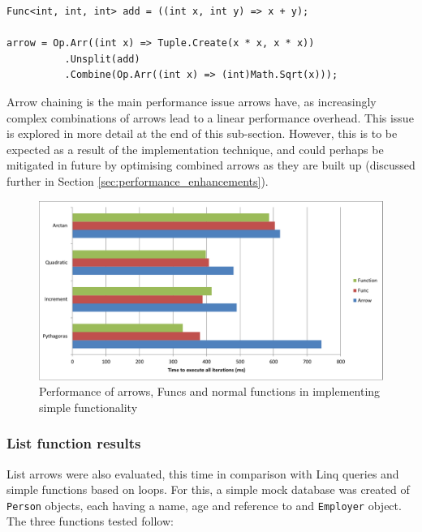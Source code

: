 \documentclass[12pt,twoside,notitlepage]{report}
\begin{document}
\begin{lstlisting}[language={[sharp]C}]
Func<int, int, int> add = ((int x, int y) => x + y);

arrow = Op.Arr((int x) => Tuple.Create(x * x, x * x))
          .Unsplit(add)
          .Combine(Op.Arr((int x) => (int)Math.Sqrt(x)));
\end{lstlisting}

Arrow chaining is the main performance issue arrows have, as increasingly complex combinations of arrows lead to a linear performance overhead. This issue is explored in more detail at the end of this sub-section. However, this is to be expected as a result of the implementation technique, and could perhaps be mitigated in future by optimising combined arrows as they are built up (discussed further in Section \ref{sec:performance_enhancements}).

\begin{figure}[!ht]
  \centering
  \includegraphics[width=\textwidth]{fig/SimpleFunctionPerformanceChart.pdf}
  \caption{Performance of arrows, Funcs and normal functions in implementing simple functionality}
  \label{fig:simple_function_performance}
\end{figure}

\subsubsection{List function results}

List arrows were also evaluated, this time in comparison with Linq queries and simple functions based on loops. For this, a simple mock database was created of \texttt{Person} objects, each having a name, age and reference to and \texttt{Employer} object. The three functions tested follow:
\end{document}
